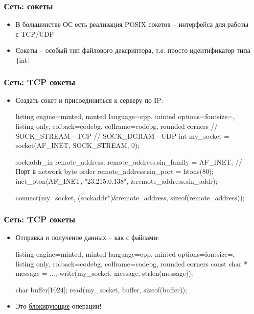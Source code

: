 \documentclass[10pt]{beamer}
\begin{document}
\begin{frame}[fragile]
\frametitle{Сеть: сокеты}
\begin{itemize}
\item В большинстве ОС есть реализация POSIX сокетов -- интерфейса для работы с TCP/UDP
\pause
\item Сокеты -- особый тип файлового дексриптора, т.е. просто идентификатор типа \texttt|int|
\end{itemize}
\end{frame}

\begin{frame}[fragile]
\frametitle{Сеть: TCP сокеты}
\begin{itemize}
\item Создать сокет и присоединиться к серверу по IP:
\begin{tcblisting}{listing engine=minted, minted language=cpp, minted options={fontsize=\scriptsize}, listing only, colback=codebg, colframe=codebg, rounded corners}
// SOCK_STREAM - TCP
// SOCK_DGRAM  - UDP
int my_socket = socket(AF_INET, SOCK_STREAM, 0);

sockaddr_in remote_address{};
remote_address.sin_family = AF_INET;
// Порт в network byte order
remote_address.sin_port = htons(80);
inet_pton(AF_INET, "23.215.0.138", &remote_address.sin_addr);

connect(my_socket, (sockaddr*)&remote_address,
  sizeof(remote_address));
\end{tcblisting}
\end{itemize}
\end{frame}

\begin{frame}[fragile]
\frametitle{Сеть: TCP сокеты}
\begin{itemize}
\item Отправка и получение данных -- как с файлами:
\begin{tcblisting}{listing engine=minted, minted language=cpp, minted options={fontsize=\scriptsize}, listing only, colback=codebg, colframe=codebg, rounded corners}
const char * message = ...;
write(my_socket, message, strlen(message));

char buffer[1024];
read(my_socket, buffer, sizeof(buffer));
\end{tcblisting}
\pause
\item Это \underline{блокирующие} операции!
\end{itemize}
\end{frame}
\end{document}
